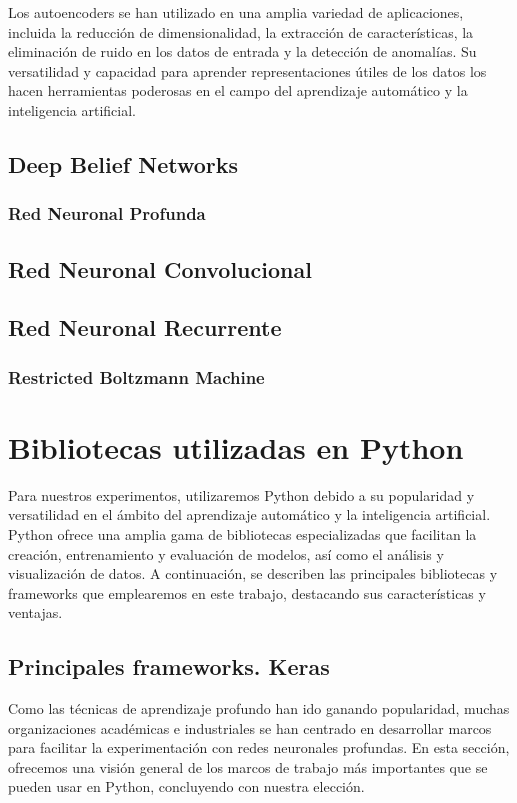 Los autoencoders se han utilizado en una amplia variedad de aplicaciones, incluida la reducción de dimensionalidad, la extracción de características, la eliminación de ruido en los datos de entrada y la detección de anomalías. Su versatilidad y capacidad para aprender representaciones útiles de los datos los hacen herramientas poderosas en el campo del aprendizaje automático y la inteligencia artificial.



\subsection{Deep Belief Networks}
\subsubsection{Red Neuronal Profunda}
\subsection{Red Neuronal Convolucional}
\subsection{Red Neuronal Recurrente}
\subsubsection{Restricted Boltzmann Machine}


\section{Bibliotecas utilizadas en Python} \label{Subsec: 3_3}

Para nuestros experimentos, utilizaremos Python debido a su popularidad y versatilidad en el ámbito del aprendizaje automático y la inteligencia artificial. Python ofrece una amplia gama de bibliotecas especializadas que facilitan la creación, entrenamiento y evaluación de modelos, así como el análisis y visualización de datos. A continuación, se describen las principales bibliotecas y frameworks que emplearemos en este trabajo, destacando sus características y ventajas.


\subsection{Principales frameworks. Keras}

Como las técnicas de aprendizaje profundo han ido ganando popularidad, muchas organizaciones académicas e industriales se han centrado en desarrollar marcos para facilitar la experimentación con redes neuronales profundas. En esta sección, ofrecemos una visión general de los marcos de trabajo más importantes que se pueden usar en Python, concluyendo con nuestra elección.


